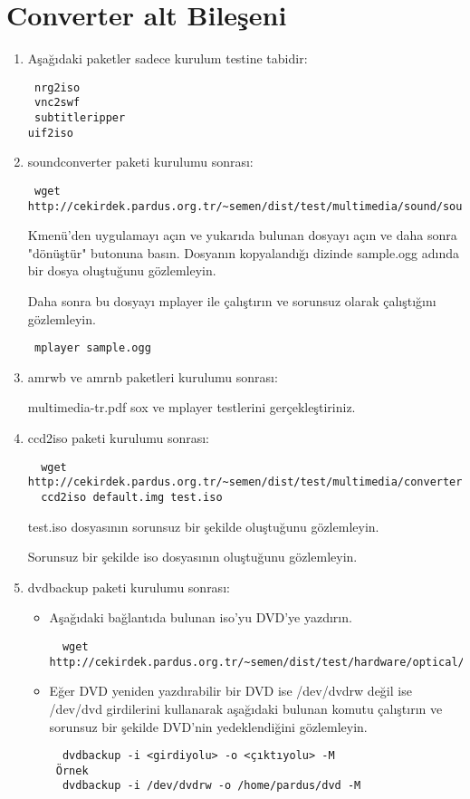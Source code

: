 \documentclass[a4paper,10pt]{article}
\begin{document}
\section{Converter alt Bileşeni}
\begin{enumerate}
 \item Aşağıdaki paketler sadece kurulum testine tabidir:
\begin{verbatim}
 nrg2iso
 vnc2swf
 subtitleripper
uif2iso
\end{verbatim}
\item soundconverter paketi kurulumu sonrası:
\begin{verbatim}
 wget http://cekirdek.pardus.org.tr/~semen/dist/test/multimedia/sound/sound/sample.mp3
\end{verbatim}

Kmenü'den uygulamayı açın ve yukarıda bulunan dosyayı açın ve daha sonra "dönüştür" butonuna basın. Dosyanın kopyalandığı dizinde sample.ogg adında bir dosya oluştuğunu gözlemleyin.

Daha sonra bu dosyayı mplayer ile çalıştırın ve sorunsuz olarak çalıştığını gözlemleyin.
\begin{verbatim}
 mplayer sample.ogg
\end{verbatim}

 \item amrwb ve amrnb paketleri kurulumu sonrası:

 multimedia-tr.pdf sox ve mplayer testlerini gerçekleştiriniz.

\item ccd2iso paketi kurulumu sonrası:
\begin{verbatim}
  wget http://cekirdek.pardus.org.tr/~semen/dist/test/multimedia/converter/default.img
  ccd2iso default.img test.iso
\end{verbatim}

test.iso dosyasının sorunsuz bir şekilde oluştuğunu gözlemleyin.

Sorunsuz bir şekilde iso dosyasının oluştuğunu gözlemleyin.
\item dvdbackup paketi kurulumu sonrası:
\begin{itemize}
 \item Aşağıdaki bağlantıda bulunan iso'yu DVD'ye yazdırın. 
\begin{verbatim}
  wget http://cekirdek.pardus.org.tr/~semen/dist/test/hardware/optical/boot.iso
\end{verbatim}
 \item Eğer DVD yeniden yazdırabilir bir DVD ise /dev/dvdrw değil ise /dev/dvd girdilerini kullanarak aşağıdaki bulunan komutu çalıştırın ve sorunsuz bir şekilde DVD'nin yedeklendiğini gözlemleyin.
\begin{verbatim}
  dvdbackup -i <girdiyolu> -o <çıktıyolu> -M
 Örnek 
  dvdbackup -i /dev/dvdrw -o /home/pardus/dvd -M
\end{verbatim}
 

\end{itemize}
\end{enumerate}
\end{document}
